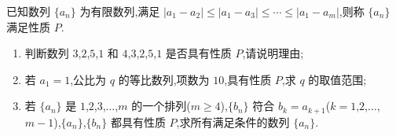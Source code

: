 \begin{problem}
已知数列 \(\{a_n\}\) 为有限数列,满足 \(|a_1-a_2|\le|a_1-a_3|\le\cdots\le|a_1-a_m|\),则称 \(\{a_n\}\) 满足性质 \(P\).

\begin{enumerate}
\item 判断数列 \(3\),\(2\),\(5\),\(1\) 和 \(4\),\(3\),\(2\),\(5\),\(1\) 是否具有性质 \(P\),请说明理由;
\item 若 \(a_1=1\),公比为 \(q\) 的等比数列,项数为 \(10\),具有性质 \(P\),求 \(q\) 的取值范围;
\item 若 \(\{a_n\}\) 是 \(1\),\(2\),\(3\),\(\ldots\),\(m\) 的一个排列(\(m\ge4\)),\(\{b_n\}\) 符合 \(b_k=a_{k+1}\)(\(k=1\),\(2\),\(\ldots\),\(m-1\)),\(\{a_n\}\),\(\{b_n\}\) 都具有性质 \(P\),求所有满足条件的数列 \(\{a_n\}\).
\end{enumerate}
\end{problem}

